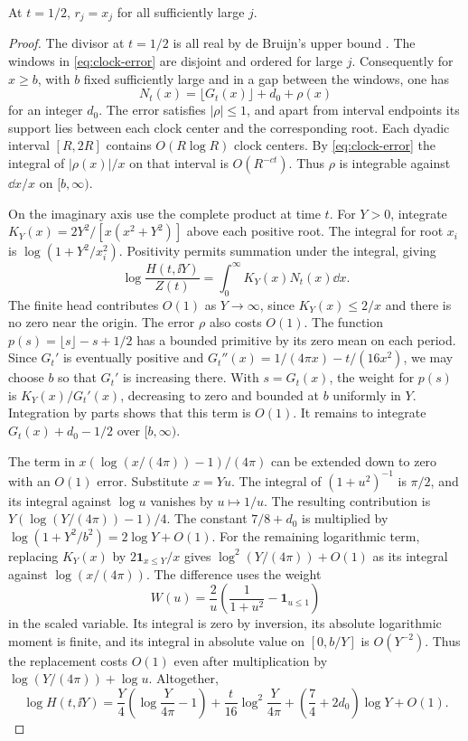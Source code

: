 \begin{proposition}\label{prop:clock-rank}
At \(t=1/2\), \(r_j=x_j\) for all sufficiently large \(j\).
\end{proposition}
\begin{proof}
The divisor at \(t=1/2\) is all real by de Bruijn's upper bound
\cite[\S1]{Polymath2019}. The windows in \eqref{eq:clock-error}
are disjoint and ordered for large \(j\). Consequently for
\(x\ge b\), with \(b\) fixed sufficiently large and in a gap
between the windows, one has
\[
 N_t(x)=\lfloor G_t(x)\rfloor+d_0+\rho(x)
\]
for an integer \(d_0\). The error satisfies \(|\rho|\le1\), and
apart from interval endpoints its support lies between each clock
center and the corresponding root. Each dyadic interval \([R,2R]\)
contains \(O(R\log R)\) clock centers. By \eqref{eq:clock-error}
the integral of \(|\rho(x)|/x\) on that interval is
\(O(R^{-ct})\). Thus \(\rho\) is integrable against \(\dd x/x\)
on \([b,\infty)\).

On the imaginary axis use the complete product at time \(t\).
For \(Y>0\), integrate
\(K_Y(x)=2Y^2/[x(x^2+Y^2)]\) above each positive root.
The integral for root \(x_i\) is \(\log(1+Y^2/x_i^2)\).
Positivity permits summation under the integral, giving
\[
 \log\frac{H(t,\ii Y)}{Z(t)}
   =\int_0^\infty K_Y(x)N_t(x)\dd x .
\]
The finite head contributes \(O(1)\) as \(Y\to\infty\), since
\(K_Y(x)\le2/x\) and there is no zero near the origin.
The error \(\rho\) also costs \(O(1)\).
The function \(p(s)=\lfloor s\rfloor-s+1/2\) has a bounded
primitive by its zero mean on each period. Since \(G_t'\)
is eventually positive and \(G_t''(x)=1/(4\pi x)-t/(16x^2)\),
we may choose \(b\) so that \(G_t'\) is increasing there.
With \(s=G_t(x)\), the weight for \(p(s)\)
is \(K_Y(x)/G_t'(x)\), decreasing to zero and bounded at
\(b\) uniformly in \(Y\). Integration by parts shows that
this term is \(O(1)\). It remains to integrate
\(G_t(x)+d_0-1/2\) over \([b,\infty)\).

The term in \(x(\log(x/(4\pi))-1)/(4\pi)\) can be extended
down to zero with an \(O(1)\) error. Substitute \(x=Yu\).
The integral of \((1+u^2)^{-1}\) is \(\pi/2\), and its
integral against \(\log u\) vanishes by \(u\mapsto1/u\).
The resulting contribution is
\(Y(\log(Y/(4\pi))-1)/4\). The constant \(7/8+d_0\)
is multiplied by \(\log(1+Y^2/b^2)=2\log Y+O(1)\).
For the remaining logarithmic term, replacing \(K_Y(x)\)
by \(2\mathbf 1_{x\le Y}/x\) gives \(\log^2(Y/(4\pi))+O(1)\)
as its integral against \(\log(x/(4\pi))\). The difference
uses the weight
\[
 W(u)=\frac2u\left(\frac{1}{1+u^2}-\mathbf 1_{u\le1}\right)
\]
in the scaled variable. Its integral is zero by inversion,
its absolute logarithmic moment is finite, and its integral
in absolute value on \([0,b/Y]\) is \(O(Y^{-2})\).
Thus the replacement costs \(O(1)\) even after multiplication
by \(\log(Y/(4\pi))+\log u\). Altogether,
\begin{equation}\label{eq:clock-count-growth}
 \log H(t,\ii Y)
 =\frac{Y}{4}\left(\log\frac{Y}{4\pi}-1\right)
   +\frac{t}{16}\log^2\frac{Y}{4\pi}
   +\left(\frac74+2d_0\right)\log Y+O(1).
\end{equation}


\end{proof}
